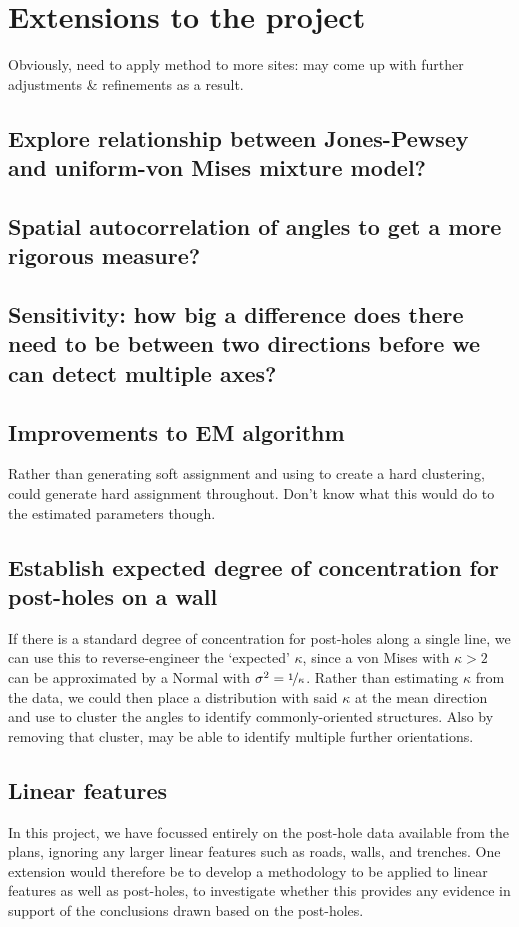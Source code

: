 \documentclass[../../ArchStats.tex]{subfiles}
\begin{document}
\section{Extensions to the project}

Obviously, need to apply method to more sites: may come up with further adjustments \& refinements as a result.

\subsection{Explore relationship between Jones-Pewsey and uniform-von Mises mixture model?}

\subsection{Spatial autocorrelation of angles to get a more rigorous measure?}

\subsection{Sensitivity: how big a difference does there need to be between two directions before we can detect multiple axes?}

\subsection{Improvements to EM algorithm}
Rather than generating soft assignment and using to create a hard clustering, could generate hard assignment throughout. Don't know what this would do to the estimated parameters though.

\subsection{Establish expected degree of concentration for post-holes on a wall}
If there is a standard degree of concentration for post-holes along a single line, we can use this to reverse-engineer the `expected' $\kappa$, since a von Mises with $\kappa > 2$ can be approximated by a Normal with $\sigma^2 = \nicefrac{1}{\kappa}$. Rather than estimating $\kappa$ from the data, we could then place a distribution with said $\kappa$ at the mean direction and use to cluster the angles to identify commonly-oriented structures. Also by removing that cluster, may be able to identify multiple further orientations.

\subsection{Linear features}
In this project, we have focussed entirely on the post-hole data available from the plans, ignoring any larger linear features such as roads, walls, and trenches. One extension would therefore be to develop a methodology to be applied to linear features as well as post-holes, to investigate whether this provides any evidence in support of the conclusions drawn based on the post-holes.
\end{document}

